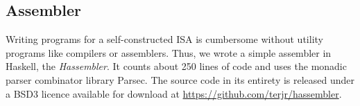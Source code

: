 \subsection{Assembler}

Writing programs for a self-constructed ISA is cumbersome without utility
programs like compilers or assemblers. Thus, we wrote a simple assembler in
Haskell, the \textit{Hassembler}. It counts about 250 lines of code and uses the
monadic parser combinator library Parsec. The source code in its entirety is
released under a BSD3 licence available for download at
\url{https://github.com/terjr/hassembler}.
